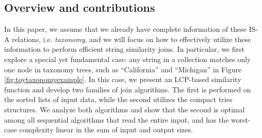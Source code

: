 
\subsection{Overview and contributions}

In this paper, we assume that we already have complete
information of these IS-A relations, i.e. \textit{taxonomy}, and we will focus on how
to effectively utilize these information to  perform efficient string similarity joins. In particular, we first explore a special yet fundamental case: any string in a collection matches only one node in taxonomy trees, such as  ``\textsf{California}''  and ``\textsf{Michigan}'' in Figure \ref{fig:toytaxonomyexample}.   In this case, we present an LCP-based similarity function and  develop two families of join algorithms. The first is performed on the sorted lists of input data, while the second utilizes the compact tries structures. We analyze both algorithms and show that the second is optimal among all sequential algorithms that read the entire input, and has the worst-case complexity linear in the sum of input and output sizes.






